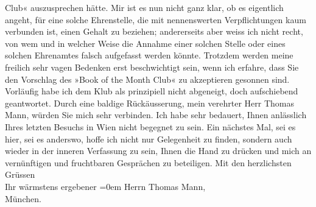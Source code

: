 \begin{ledgroupsized}[t]{13cm}
               Club« auszusprechen hätte. Mir ist es nun nicht ganz klar, ob es eigentlich
               angeht, für eine solche Ehrenstelle, die mit nennenswerten Verpflichtungen kaum
               verbunden ist, einen Gehalt zu beziehen; andererseits aber weiss ich nicht recht, von
               wem und in welcher Weise die Annahme einer solchen Stelle oder eines solchen
               Ehrenamtes falsch aufgefasst werden könnte. Trotzdem werden meine freilich sehr vagen
               Bedenken erst beschwichtigt sein, wenn ich erfahre, dass Sie den Vorschlag des »Book of the Month Club« zu akzeptieren gesonnen
               sind. Vorläufig habe ich dem Klub als prinzipiell nicht abgeneigt, doch aufschiebend
               geantwortet. Durch eine baldige Rückäusserung, mein verehrter Herr Thomas Mann,
               würden Sie mich sehr verbinden.\pend
           \pstart
           Ich habe sehr bedauert\introOben{},\introOben{} Ihnen anlässlich Ihres letzten
               Besuchs in Wien nicht begegnet zu sein. Ein
               nächstes Mal, sei es hier, sei es anderswo, hoffe ich nicht nur Gelegenheit zu finden, sondern auch  wieder in der inneren Verfassung zu sein\introOben{},\introOben{}
               Ihnen die Hand zu drücken und mich an vernünftigen und fruchtbaren Gesprächen zu
               beteiligen.\pend
           \pstart
           Mit den herzlichsten Grüssen{\\[\baselineskip]}Ihr wärmstens ergebener\pend
           \leftskip=0em{}{\bigskip}\pstart
           \noindent{}Herrn Thomas Mann,{\\}München.\pend
           
         
         \endnumbering{}\end{ledgroupsized}  \newcommand{\dateiname}{L02507}\newcommand{\titel}{Arthur Schnitzler an Thomas Mann, 30. 1. 1929}\newcommand{\editorInnen}{Martin Anton Müller und Gerd-Hermann Susen}
      